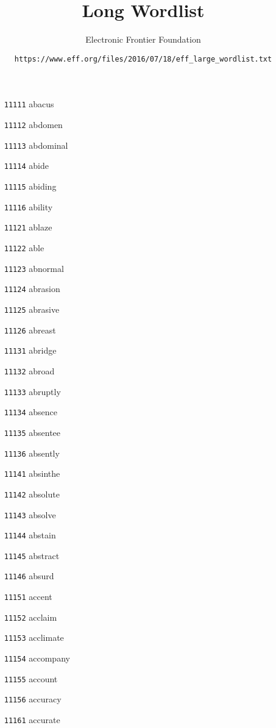 \documentclass[twoside,11pt]{article}
\begin{document}
\title{\textbf{Long Wordlist}}
\author{Electronic Frontier Foundation}
\date{\texttt{https://www.eff.org/files/2016/07/18/eff\_large\_wordlist.txt}}
\maketitle
\begin{multicols}{5}
\begin{enumerate}
\setlength\itemsep{0in}
\item[\texttt{11111}] abacus
\item[\texttt{11112}] abdomen
\item[\texttt{11113}] abdominal
\item[\texttt{11114}] abide
\item[\texttt{11115}] abiding
\item[\texttt{11116}] ability
\item[\texttt{11121}] ablaze
\item[\texttt{11122}] able
\item[\texttt{11123}] abnormal
\item[\texttt{11124}] abrasion
\item[\texttt{11125}] abrasive
\item[\texttt{11126}] abreast
\item[\texttt{11131}] abridge
\item[\texttt{11132}] abroad
\item[\texttt{11133}] abruptly
\item[\texttt{11134}] absence
\item[\texttt{11135}] absentee
\item[\texttt{11136}] absently
\item[\texttt{11141}] absinthe
\item[\texttt{11142}] absolute
\item[\texttt{11143}] absolve
\item[\texttt{11144}] abstain
\item[\texttt{11145}] abstract
\item[\texttt{11146}] absurd
\item[\texttt{11151}] accent
\item[\texttt{11152}] acclaim
\item[\texttt{11153}] acclimate
\item[\texttt{11154}] accompany
\item[\texttt{11155}] account
\item[\texttt{11156}] accuracy
\item[\texttt{11161}] accurate

\end{enumerate}
\end{multicols}
\end{document}
